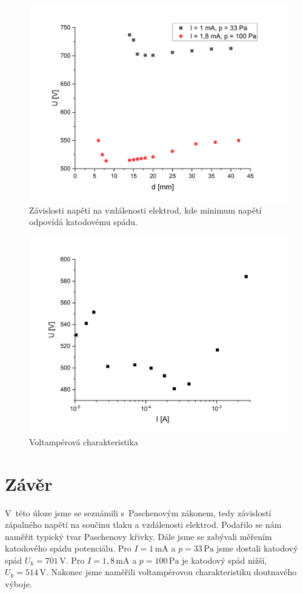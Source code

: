 \documentclass[a4paper,12pt]{article}
\begin{document}

\begin{figure}[h!]
	\centering
	\includegraphics[width=120mm]{KatodovySpad.png}
	\caption{Závislosti napětí na vzdálenosti elektrod, kde minimum napětí odpovídá katodovému spádu.}
	\label{KatodovySpad}
\end{figure}

\begin{figure}[h!]
	\centering
	\includegraphics[width=120mm]{VAodpor.png}
	\caption{Voltampérová charakteristika}
	\label{VAodpor}
\end{figure}

\newpage
\section{Závěr}
V~této úloze jsme se seznámili s~Paschenovým zákonem, tedy závislostí zápalného napětí na součinu tlaku a vzdálenosti elektrod. Podařilo se nám naměřit typický tvar Paschenovy křivky. Dále jsme se zabývali měřením katodového spádu potenciálu. Pro $I = 1\,\si{\milli\ampere}$ a $p = 33\,\si{\pascal}$ jsme dostali katodový spád $U_k = 701\,\si{\volt}$. Pro $I = 1,8\,\si{\milli\ampere}$ a $p = 100\,\si{\pascal}$ je katodový spád nižší,  $U_k = 514\,\si{\volt}$. Nakonec jsme naměřili voltampérovou charakteristiku doutnavého výboje.
\end{document}
